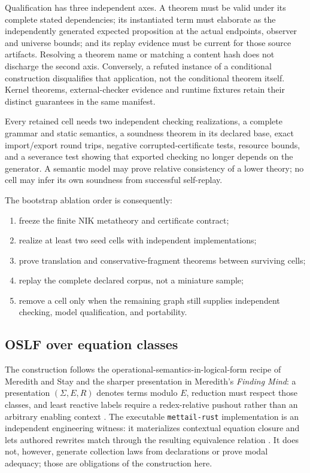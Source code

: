 \documentclass[11pt]{article}
\theoremstyle{definition}
\theoremstyle{remark}
\begin{document}
Qualification has three independent axes. A theorem must be valid under
its complete stated dependencies; its instantiated term must elaborate as
the independently generated expected proposition at the actual endpoints,
observer and universe bounds; and its replay evidence must be current for
those source artifacts. Resolving a theorem name or matching a content
hash does not discharge the second axis. Conversely, a refuted instance
of a conditional construction disqualifies that application, not the
conditional theorem itself. Kernel theorems, external-checker evidence and
runtime fixtures retain their distinct guarantees in the same manifest.

Every retained cell needs two independent checking realizations, a complete
grammar and static semantics, a soundness theorem in its declared base, exact
import/export round trips, negative corrupted-certificate tests, resource
bounds, and a severance test showing that exported checking no longer depends
on the generator.  A semantic model may prove relative consistency of a lower
theory; no cell may infer its own soundness from successful self-replay.

The bootstrap ablation order is consequently:

\begin{enumerate}
\item freeze the finite NIK metatheory and certificate contract;
\item realize at least two seed cells with independent implementations;
\item prove translation and conservative-fragment theorems between surviving
  cells;
\item replay the complete declared corpus, not a miniature sample;
\item remove a cell only when the remaining graph still supplies independent
  checking, model qualification, and portability.
\end{enumerate}

\subsection{OSLF over equation classes}

The construction follows the operational-semantics-in-logical-form recipe of
Meredith and Stay and the sharper presentation in Meredith's
\emph{Finding Mind}: a presentation $(\Sigma,E,R)$ denotes terms modulo
$E$, reduction must respect those classes, and least reactive labels require a
redex-relative pushout rather than an arbitrary enabling context
\cite{MeredithStayOSLF,MeredithFindingMind}.  The executable
\texttt{mettail-rust} implementation is an independent engineering witness:
it materializes contextual equation closure and lets authored rewrites match
through the resulting equivalence relation \cite{MeTTaILRust}.  It does not,
however, generate collection laws from declarations or prove modal adequacy;
those are obligations of the construction here.
\end{document}
